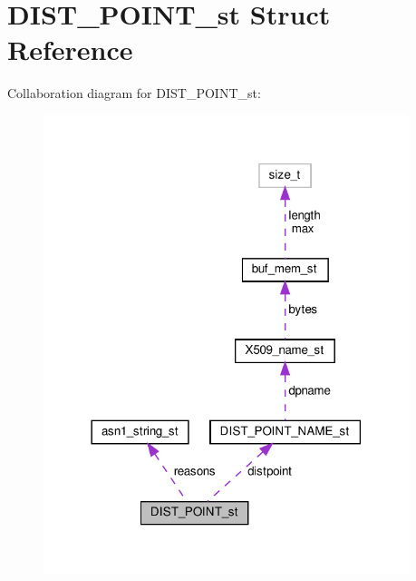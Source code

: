 \hypertarget{structDIST__POINT__st}{}\section{D\+I\+S\+T\+\_\+\+P\+O\+I\+N\+T\+\_\+st Struct Reference}
\label{structDIST__POINT__st}


Collaboration diagram for D\+I\+S\+T\+\_\+\+P\+O\+I\+N\+T\+\_\+st\+:
\nopagebreak
\begin{figure}[H]
\begin{center}
\leavevmode
\includegraphics[width=302pt]{structDIST__POINT__st__coll__graph}
\end{center}
\end{figure}
